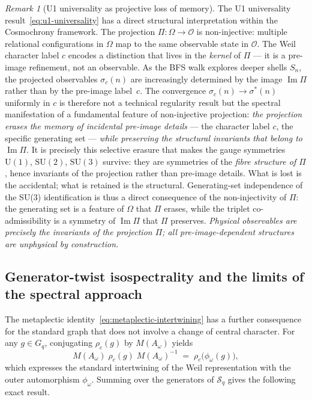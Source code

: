 \documentclass[11pt,a4paper]{article}
\theoremstyle{definition}
\theoremstyle{remark}
\newtheorem{remark}[theorem]{Remark}
\newcommand{\SU}{\mathrm{SU}}
\newcommand{\Gq}{G_q}
\newcommand{\Sq}{\mathcal{S}_q}
\begin{document}
      \begin{remark}[U1 universality as projective loss of memory]
        \label{rmk:loss-of-memory}
        The U1 universality result~\eqref{eq:u1-universality} has a direct structural interpretation
        within the Cosmochrony framework.
        The projection $\Pi: \Omega \to \mathcal{O}$ is non-injective: multiple relational
        configurations in $\Omega$ map to the same observable state in $\mathcal{O}$.
        The Weil character label $c$ encodes a distinction that lives in the \emph{kernel} of $\Pi$
        --- it is a pre-image refinement, not an observable.
        As the BFS walk explores deeper shells $S_n$, the projected observables $\sigma_c(n)$ are
        increasingly determined by the image $\operatorname{Im}\Pi$ rather than by the
        pre-image label~$c$.
        The convergence $\sigma_c(n) \to \sigma^*(n)$ uniformly in $c$ is therefore not a
        technical regularity result but the spectral manifestation of a fundamental feature of
        non-injective projection: \emph{the projection erases the memory of incidental pre-image
        details} --- the character label $c$, the specific generating set --- \emph{while preserving
        the structural invariants that belong to $\operatorname{Im}\Pi$}.
        It is precisely this selective erasure that makes the gauge symmetries
        $\mathrm{U}(1)$, $\SU(2)$, $\SU(3)$ survive: they are symmetries of the
        \emph{fibre structure of $\Pi$}, hence invariants of the projection rather than
        pre-image details.
        What is lost is the accidental; what is retained is the structural.
        Generating-set independence of the SU(3) identification is thus a direct consequence of
        the non-injectivity of $\Pi$: the generating set is a feature of $\Omega$ that $\Pi$ erases,
        while the triplet co-admissibility is a symmetry of $\operatorname{Im}\Pi$ that $\Pi$ preserves.
        \emph{Physical observables are precisely the invariants of the projection $\Pi$;
        all pre-image-dependent structures are unphysical by construction.}
      \end{remark}

    \subsection{Generator-twist isospectrality and the limits of the spectral approach}
      \label{ssec:isospectrality}

      The metaplectic identity~\eqref{eq:metaplectic-intertwining} has a further consequence for the
      standard graph that does not involve a change of central character.
      For any $g \in \Gq$, conjugating $\rho_c(g)$ by $M(A_\omega)$ yields
      \begin{equation}
        M(A_\omega)\;\rho_c(g)\;M(A_\omega)^{-1} \;=\; \rho_c\!\bigl(\phi_\omega(g)\bigr),
      \end{equation}
      which expresses the standard intertwining of the Weil representation with the outer automorphism
      $\phi_\omega$.
      Summing over the generators of $\Sq$ gives the following exact result.
\end{document}
